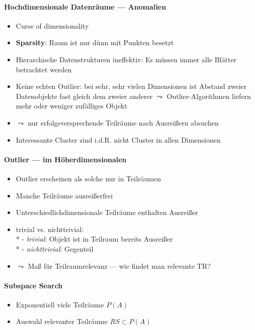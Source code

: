 \paragraph{Hochdimensionale Datenräume --- Anomalien}
\begin{itemize}
	\item Curse of dimensionality
	\item \textbf{Sparsity}: Raum ist nur dünn mit Punkten besetzt
	\item Hierarchische Datenstrukturen ineffektiv: Es müssen immer alle Blätter betrachtet werden
	\item Keine echten Outlier: bei sehr, sehr vielen Dimensionen ist Abstand zweier Datenobjekte fast gleich dem zweier anderer \( \leadsto \) Outlier-Algorithmen liefern mehr oder weniger zufälliges Objekt
	\item \( \leadsto \) nur erfolgsversprechende Teilräume nach Ausreißern absuchen
	\item Interessante Cluster sind i.d.R. nicht Cluster in allen Dimensionen
\end{itemize}

\paragraph{Outlier --- im Höherdimensionalen}
\begin{itemize}
	\item Outlier erscheinen als solche nur in Teilräumen
	\item Manche Teilräume ausreißerfrei
	\item Unterschiedlichdimensionale Teilräume enthalten Ausreißer
	\item trivial vs. nichttrivial: \\*
		- \emph{trivial}: Objekt ist in Teilraum bereits Ausreißer \\*
		- \emph{nichttrivial}: Gegenteil
	\item \( \leadsto \) Maß für Teilraumrelevanz --- wie findet man relevante TR?
\end{itemize}

\paragraph{Subspace Search}
\begin{itemize}
	\item Exponentiell viele Teilräume \( P(A) \)
	\item Auswahl relevanter Teilräume \( RS \subset P(A) \)
\end{itemize}

